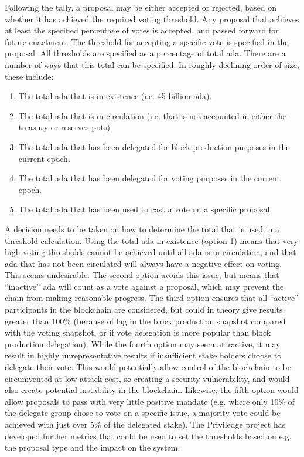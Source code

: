 Following the tally, a proposal may be either accepted or rejected, based on whether it has achieved the required voting threshold.  Any proposal that achieves at least
the specified percentage of votes is accepted, and passed forward for future enactment.
The threshold for accepting a specific vote is specified in the proposal.
All thresholds are specified as a percentage of total ada.  There are a number of ways that this total can be specified.  In roughly declining order of size, these include:

\begin{enumerate}
\item
  The total ada that is in existence (i.e. 45 billion ada).
\item
  The total ada that is in circulation (i.e. that is not accounted in either the treasury or reserves pots).
\item
  The total ada that has been delegated for block production purposes in the current epoch.
\item
  The total ada that has been delegated for voting purposes in the current epoch.
\item
  The total ada that has been used to cast a vote on a specific proposal.
\end{enumerate}

A decision needs to be taken on how to determine the total that is used in a threshold calculation.
Using the total ada in existence (option 1) means that very high voting thresholds cannot be achieved until all ada
is in circulation, and that ada that has not been circulated will always have a negative effect on voting.
This seems undesirable.
The second option avoids this issue, but means that ``inactive'' ada will count as a vote against a proposal, which may prevent the chain from making reasonable progress.
The third option ensures that all ``active'' participants in the blockchain are considered, but could in theory give results greater than 100\% (because of lag in the
block production snapshot compared with the voting snapshot, or if vote delegation is more popular than block production delegation).
While the fourth option may seem attractive, it may result in highly unrepresentative results if insufficient stake holders choose to delegate their vote.  This would potentially allow control of the
blockchain to be circumvented at low attack cost, so creating a security vulnerability, and would also create potential instability in the blockchain.
Likewise, the fifth option would allow proposals to pass with very little positive mandate (e.g. where only 10\% of the delegate group chose to vote on a specific issue, a majority vote could be
achieved with just over 5\% of the delegated stake).
The Priviledge project has developed further metrics that could be used to set the thresholds based on e.g. the proposal type and the
impact on the system.
